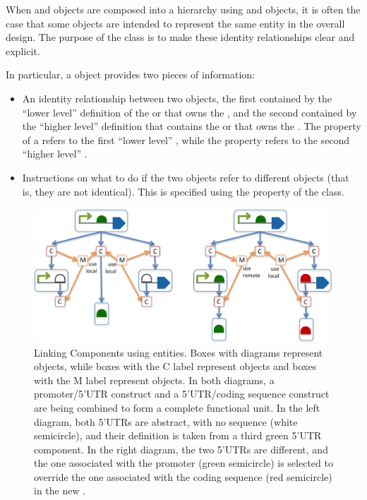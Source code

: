 When  and  objects are composed into a hierarchy using  and  objects, it is often the case that some  objects are intended to represent the same entity in the overall design. The purpose of the  class is to make these identity relationships clear and explicit.

In particular, a  object provides two pieces of information:
\begin{itemize}
\item An identity relationship between two  objects, the first contained by the ``lower level'' definition of the  or  that owns the
  , and the second contained by the ``higher level'' definition that contains the  or  that owns the . The  property of a  refers to the first ``lower level'' , while the  property refers to the second ``higher level'' .
\item Instructions on what to do if the two  objects refer to different  objects (that is, they are not identical). This is specified using the  property of the  class.
\end{itemize}

\begin{figure}[ht]
\begin{center}
\includegraphics[scale=1]{images/MapsTo_Diagram2}
\caption{Linking Components using  entities. Boxes with diagrams represent  objects, while boxes with the C label represent  objects and boxes with the M label represent  objects.  In both diagrams, a promoter/5'UTR construct and a 5'UTR/coding sequence construct are being combined to form a complete functional unit.  
In the left diagram, both 5'UTRs are abstract, with no sequence (white semicircle), and their definition is taken from a third green 5'UTR component. In the right diagram, the two 5'UTRs are different, and the one associated with the promoter (green semicircle) is selected to override the one associated with the coding sequence (red semicircle) in the new .}
\label{image:maps_to_diagram2}
\end{center}
\end{figure}

